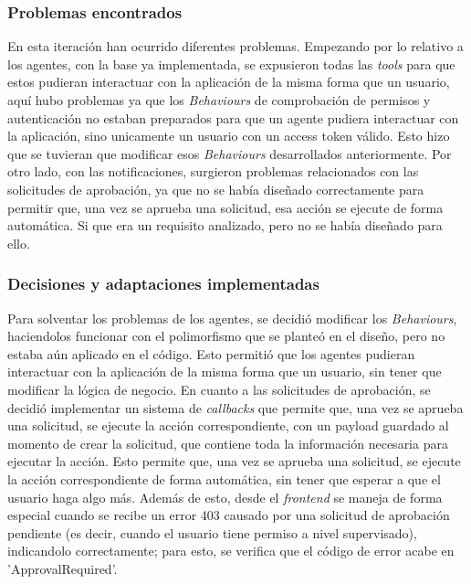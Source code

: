 \subsubsection{Problemas encontrados}
En esta iteración han ocurrido diferentes problemas. Empezando por lo relativo a los agentes, con la base ya implementada, se expusieron todas las \emph{tools} para que estos pudieran interactuar con la aplicación de la misma forma que un usuario, aquí hubo problemas ya que los \emph{Behaviours} de comprobación de permisos y autenticación no estaban preparados para que un agente pudiera interactuar con la aplicación, sino unicamente un usuario con un access token válido. Esto hizo que se tuvieran que modificar esos \emph{Behaviours} desarrollados anteriormente.
Por otro lado, con las notificaciones, surgieron problemas relacionados con las solicitudes de aprobación, ya que no se había diseñado correctamente para permitir que, una vez se aprueba una solicitud, esa acción se ejecute de forma automática. Si que era un requisito analizado, pero no se había diseñado para ello.

\subsubsection{Decisiones y adaptaciones implementadas}
Para solventar los problemas de los agentes, se decidió modificar los \emph{Behaviours}, haciendolos funcionar con el polimorfismo que se planteó en el diseño, pero no estaba aún aplicado en el código. Esto permitió que los agentes pudieran interactuar con la aplicación de la misma forma que un usuario, sin tener que modificar la lógica de negocio.
En cuanto a las solicitudes de aprobación, se decidió implementar un sistema de \emph{callbacks} que permite que, una vez se aprueba una solicitud, se ejecute la acción correspondiente, con un payload guardado al momento de crear la solicitud, que contiene toda la información necesaria para ejecutar la acción. Esto permite que, una vez se aprueba una solicitud, se ejecute la acción correspondiente de forma automática, sin tener que esperar a que el usuario haga algo más. Además de esto, desde el \emph{frontend} se maneja de forma especial cuando se recibe un error 403 causado por una solicitud de aprobación pendiente (es decir, cuando el usuario tiene permiso a nivel supervisado), indicandolo correctamente; para esto, se verifica que el código de error acabe en 'ApprovalRequired'.

